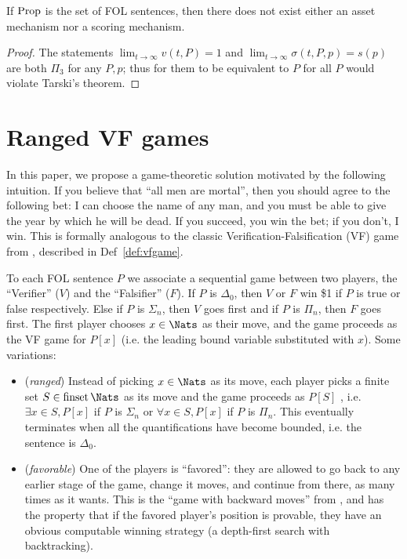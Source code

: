 \begin{theorem}
  If $\operatorname{Prop}$ is the set of FOL sentences, then there does not exist either an asset mechanism nor a scoring mechanism.
  \label{thm:nogo}
\end{theorem}
\begin{proof}
  The statements $\lim_{t\to\infty}v(t,P)=1$ and $\lim_{t\to\infty}\sigma(t,P,p)=s(p)$ are both $\Pi_3$ for any $P, p$; thus for them to be equivalent to $P$ for all $P$ would violate Tarski's theorem.
\end{proof}

\section{Ranged VF games}
\label{vf/sec:framework}

In this paper, we propose a game-theoretic solution motivated by the following intuition. If you believe that ``all men are mortal'', then you should agree to the following bet: I can choose the name of any man, and you must be able to give the year by which he will be dead. If you succeed, you win the bet; if you don't, I win. This is formally analogous to the classic Verification-Falsification (VF) game from \cite{hintikkaGameTheoreticSemantics1997}, described in Def~\ref{def:vfgame}.


\begin{definition}
  To each FOL sentence $P$ we associate a sequential game between two players, the ``Verifier'' ($V$) and the ``Falsifier'' ($F$). If $P$ is $\Delta_0$, then $V$ or $F$ win \$1 if $P$ is true or false respectively. Else if $P$ is $\Sigma_n$, then $V$ goes first and if $P$ is $\Pi_n$, then $F$ goes first. The first player chooses $x\in\Nats$ as their move, and the game proceeds as the VF game for $P[x]$ (i.e. the leading bound variable substituted with $x$). Some variations:
  \begin{itemize}
  \item (\emph{ranged}) Instead of picking $x\in\Nats$ as its move, each player picks a finite set $S\in\finset\Nats$ as its move and the game proceeds as $P[S]$ , i.e. $\exists x\in S,P[x]$ if $P$ is $\Sigma_n$ or $\forall x\in S,P[x]$ if $P$ is $\Pi_n$. This eventually terminates when all the quantifications have become bounded, i.e. the sentence is $\Delta_0$.
  \item (\emph{favorable}) One of the players is ``favored'': they are allowed to go back to any earlier stage of the game, change it moves, and continue from there, as many times as it wants. This is the ``game with backward moves'' from \cite{bonnayPreuvesJeuxSemantiques2004,boyerProofTruth2012}, and has the property that if the favored player's position is provable, they have an obvious computable winning strategy (a depth-first search with backtracking).
  \end{itemize}
  \label{def:vfgame}
\end{definition}

